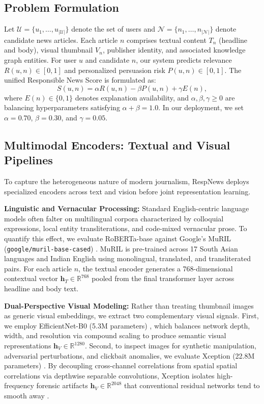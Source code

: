 \documentclass[conference]{IEEEtran}
\begin{document}
\subsection{Problem Formulation}
Let $\mathcal{U} = \{u_1, \dots, u_{|\mathcal{U}|}\}$ denote the set of users and $\mathcal{N} = \{n_1, \dots, n_{|\mathcal{N}|}\}$ denote candidate news articles. Each article $n$ comprises textual content $T_n$ (headline and body), visual thumbnail $V_n$, publisher identity, and associated knowledge graph entities. For user $u$ and candidate $n$, our system predicts relevance $R(u,n) \in [0,1]$ and personalized persuasion risk $P(u,n) \in [0,1]$. The unified Responsible News Score is formulated as:
\begin{equation}
S(u,n) = \alpha R(u,n) - \beta P(u,n) + \gamma E(n),
\label{eq:score}
\end{equation}
where $E(n) \in \{0, 1\}$ denotes explanation availability, and $\alpha, \beta, \gamma \ge 0$ are balancing hyperparameters satisfying $\alpha + \beta = 1.0$. In our deployment, we set $\alpha=0.70$, $\beta=0.30$, and $\gamma=0.05$.

\subsection{Multimodal Encoders: Textual and Visual Pipelines}
To capture the heterogeneous nature of modern journalism, RespNews deploys specialized encoders across text and vision before joint representation learning.

\textbf{Linguistic and Vernacular Processing:} Standard English-centric language models often falter on multilingual corpora characterized by colloquial expressions, local entity transliterations, and code-mixed vernacular prose. To quantify this effect, we evaluate RoBERTa-base \cite{liu_roberta} against Google's MuRIL (\texttt{google/muril-base-cased}) \cite{khanuja_muril}. MuRIL is pre-trained across 17 South Asian languages and Indian English using monolingual, translated, and transliterated pairs. For each article $n$, the textual encoder generates a 768-dimensional contextual vector $\mathbf{h}_T \in \mathbb{R}^{768}$ pooled from the final transformer layer across headline and body text.

\textbf{Dual-Perspective Visual Modeling:} Rather than treating thumbnail images as generic visual embeddings, we extract two complementary visual signals. First, we employ EfficientNet-B0 (5.3M parameters) \cite{tan_efficientnet}, which balances network depth, width, and resolution via compound scaling to produce semantic visual representations $\mathbf{h}_V \in \mathbb{R}^{1280}$. Second, to inspect images for synthetic manipulation, adversarial perturbations, and clickbait anomalies, we evaluate Xception (22.8M parameters) \cite{chollet_xception}. By decoupling cross-channel correlations from spatial spatial correlations via depthwise separable convolutions, Xception isolates high-frequency forensic artifacts $\mathbf{h}_V \in \mathbb{R}^{2048}$ that conventional residual networks tend to smooth away \cite{rossler_faceforensics}.
\end{document}

